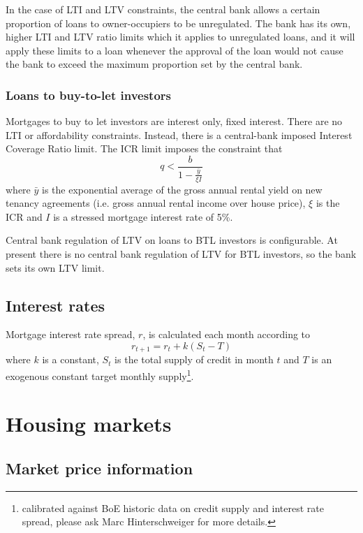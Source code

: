 \documentclass{report}
\begin{document}
In the case of LTI and LTV constraints, the central bank allows a certain proportion of loans to owner-occupiers to be unregulated. The bank has its own, higher LTI and LTV ratio limits which it applies to unregulated loans, and it will apply these limits to a loan whenever the approval of the loan would not cause the bank to exceed the maximum proportion set by the central bank.

\subsubsection{Loans to buy-to-let investors}
Mortgages to buy to let investors are interest only, fixed interest. There are no LTI or affordability constraints. Instead, there is a central-bank imposed Interest Coverage Ratio limit. The ICR limit imposes the constraint that
\begin{equation}
q < \frac{b}{1 - \frac{\bar{y}}{\xi I}}
\end{equation}
where $\bar{y}$ is the exponential average of the gross annual rental yield on new tenancy agreements (i.e. gross annual rental income over house price), $\xi$ is the ICR and $I$ is a stressed mortgage interest rate of 5\%.

Central bank regulation of LTV on loans to BTL investors is configurable. At present there is no central bank regulation of LTV for BTL investors, so the bank sets its own LTV limit.

\subsection{Interest rates}
Mortgage interest rate spread, $r$, is calculated each month according to
\begin{equation}
r_{t+1} = r_{t} + k(S_t-T)
\label{spread}
\end{equation}
where $k$ is a constant, $S_t$ is the total supply of credit in month $t$ and $T$ is an exogenous constant target monthly supply\footnote{calibrated against BoE historic data on credit supply and interest rate spread, please ask Marc Hinterschweiger for more details.}.

\section{Housing markets}

\subsection{Market price information}
\end{document}
